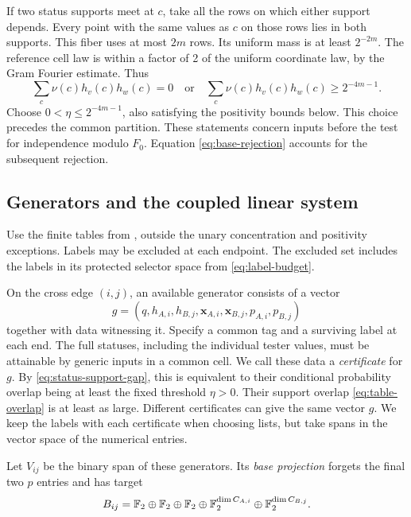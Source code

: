 If two status supports meet at \(c\), take all the rows on which
either support depends. Every point with the same values as \(c\) on
those rows lies in both supports. This fiber uses at most \(2m\) rows. Its uniform mass is at least \(2^{-2m}\). The
reference cell law is within a factor of 2 of the uniform coordinate law,
by the Gram Fourier estimate. Thus
\begin{equation}\label{eq:status-support-gap}
 \sum_c\nu(c)h_v(c)h_w(c)=0
 \quad\text{or}\quad
 \sum_c\nu(c)h_v(c)h_w(c)\ge2^{-4m-1}.
\end{equation}
Choose \(0<\eta\le2^{-4m-1}\), also satisfying the positivity bounds
below. This choice precedes the common partition. These statements concern
inputs before the test for independence modulo \(F_0\). Equation
\eqref{eq:base-rejection} accounts for the subsequent rejection.

\subsection{Generators and the coupled linear system}

Use the finite tables from , outside the unary
concentration and positivity exceptions. Labels may be excluded at each
endpoint. The excluded set includes the labels in its protected selector
space from \eqref{eq:label-budget}.

\begin{definition}
\label{def:status-generator}
On the cross edge $(i,j)$, an available generator consists of a vector
\begin{equation}
\label{eq:status-generator-vector}
g=(q,h_{A,i},h_{B,j},\mathbf x_{A,i},\mathbf x_{B,j},p_{A,i},p_{B,j})
\end{equation}
together with data witnessing it. Specify a common tag and a surviving
label at each end. The full statuses, including the individual tester
values, must be attainable by generic inputs in a common cell. We call
these data a \emph{certificate} for \(g\). By
\eqref{eq:status-support-gap}, this is equivalent to their conditional
probability overlap being at least the fixed threshold $\eta>0$.
Their support overlap \eqref{eq:table-overlap} is at least as large.
Different certificates can give the same vector \(g\). We keep the
labels with each certificate when choosing lists, but take spans in
the vector space of the numerical entries.

Let $V_{ij}$ be the binary span of these generators. Its \emph{base
projection} forgets the final two $p$ entries and has target
\[
B_{ij}=\mathbb F_2\oplus\mathbb F_2\oplus\mathbb F_2\oplus
             \mathbb F_2^{\dim C_{A,i}}\oplus\mathbb F_2^{\dim C_{B,j}}.
\]
\end{definition}

